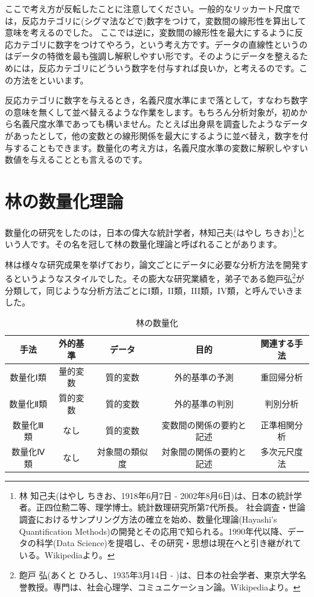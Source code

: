 \documentclass{ltjsbook}
\begin{document}
ここで考え方が反転したことに注意してください。一般的なリッカート尺度では，反応カテゴリに(シグマ法などで)数字をつけて，変数間の線形性を算出して意味を考えるのでした。
ここでは逆に，変数間の線形性を最大にするように反応カテゴリに数字をつけてやろう，という考え方です。データの直線性というのはデータの特徴を最も強調し解釈しやすい形です。そのようにデータを整えるためには，反応カテゴリにどういう数字を付与すれば良いか，と考えるのです。この方法をといいます。

反応カテゴリに数字を与えるとき，名義尺度水準にまで落として，すなわち数字の意味を無くして並べ替えるような作業をします。もちろん分析対象が，初めから名義尺度水準であっても構いません。たとえば出身県を調査したようなデータがあったとして，他の変数との線形関係を最大にするように並べ替え，数字を付与することもできます。数量化の考え方は，名義尺度水準の変数に解釈しやすい数値を与えることとも言えるのです。

\section{林の数量化理論}
数量化の研究をしたのは，日本の偉大な統計学者，林知己夫(はやし ちきお)\footnote{林 知己夫(はやし ちきお、1918年6月7日 - 2002年8月6日)は、日本の統計学者。正四位勲二等、理学博士。統計数理研究所第7代所長。 社会調査・世論調査におけるサンプリング方法の確立を始め、数量化理論(Hayashi's Quantification Methods)の開発とその応用で知られる。1990年代以降、データの科学(Data Science)を提唱し、その研究・思想は現在へと引き継がれている。Wikipediaより。}という人です。その名を冠して林の数量化理論と呼ばれることがあります。

林は様々な研究成果を挙げており，論文ごとにデータに必要な分析方法を開発するというようなスタイルでした。その膨大な研究業績を，弟子である飽戸弘\footnote{飽戸 弘(あくと ひろし、1935年3月14日 - )は、日本の社会学者、東京大学名誉教授。専門は、社会心理学、コミュニケーション論。Wikipediaより。}が分類して，同じような分析方法ごとにI類，II類，III類，IV類，と呼んでいきました。

\begin{table}[h]
	\caption{林の数量化}
	\begin{tabular}{c|c|c|c|c}
	手法 & 外的基準 & データ & 目的 & 関連する手法\\
	\hline
	数量化Ⅰ類 & 量的変数 & 質的変数 & 外的基準の予測 & 重回帰分析\\
	数量化Ⅱ類 & 質的変数 & 質的変数 & 外的基準の判別 & 判別分析\\
	数量化Ⅲ類 & なし & 質的変数 & 変数間の関係の要約と記述 & 正準相関分析\\
	数量化Ⅳ類 & なし & 対象間の類似度 & 対象間の関係の要約と記述 & 多次元尺度法\\
	\end{tabular}
	\label{tbl::14_03}
\end{table}
\end{document}
